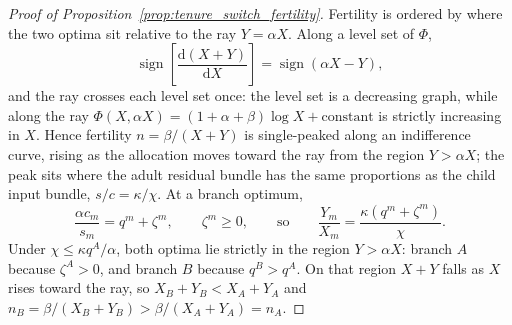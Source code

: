 \documentclass[11pt]{article}
\newcommand{\dd}{\mathrm d}
\newcommand{\1}{\mathbf 1}
\begin{document}
\begin{proof}[Proof of Proposition~\ref{prop:tenure_switch_fertility}]
Fertility is ordered by where the two optima sit relative to the ray $Y=\alpha X$. Along a level set of $\Phi$,
\[
\operatorname{sign}\left[\frac{\dd(X+Y)}{\dd X}\right]
=
\operatorname{sign}(\alpha X-Y),
\]
and the ray crosses each level set once: the level set is a decreasing graph, while along the ray $\Phi(X,\alpha X)=(1+\alpha+\beta)\log X+\text{constant}$ is strictly increasing in $X$. Hence fertility $n=\beta/(X+Y)$ is single-peaked along an indifference curve, rising as the allocation moves toward the ray from the region $Y>\alpha X$; the peak sits where the adult residual bundle has the same proportions as the child input bundle, $s/c=\kappa/\chi$. At a branch optimum,
\[
\frac{\alpha c_m}{s_m}=q^m+\zeta^m,
\qquad
\zeta^m\ge0,
\qquad\text{so}\qquad
\frac{Y_m}{X_m}
=
\frac{\kappa(q^m+\zeta^m)}{\chi}.
\]
Under $\chi\le\kappa q^A/\alpha$, both optima lie strictly in the region $Y>\alpha X$: branch $A$ because $\zeta^A>0$, and branch $B$ because $q^B>q^A$. On that region $X+Y$ falls as $X$ rises toward the ray, so $X_B+Y_B<X_A+Y_A$ and $n_B=\beta/(X_B+Y_B)>\beta/(X_A+Y_A)=n_A$.
\end{proof}

\clearpage
\end{document}
